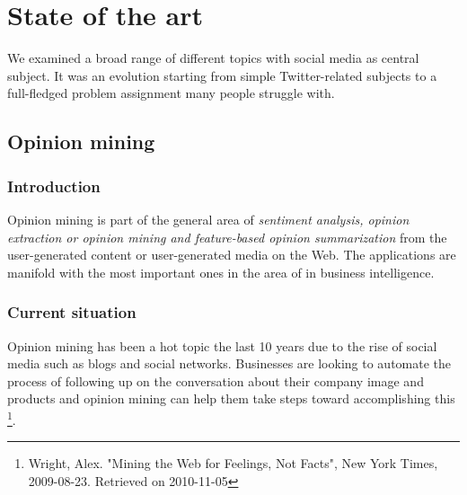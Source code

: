 \chapter{State of the art}

We examined a broad range of different topics with social media as central subject. It was an evolution starting from simple Twitter-related subjects to a full-fledged problem assignment many people struggle with. 

\section{Opinion mining}

\subsection{Introduction}
\label{general - opinion mining}
Opinion mining is part of the general area of \textit{sentiment analysis, opinion extraction or opinion mining and feature-based opinion summarization} from the user-generated content or user-generated media on the Web. The applications are manifold with the most important ones in the area of in business intelligence. 


\subsection{Current situation}


Opinion mining has been a hot topic the last 10 years due to the rise of social media such as blogs and social networks. Businesses are looking to automate the process of following up on the conversation about their company image and products and opinion mining can help them take steps toward accomplishing this \footnote{Wright, Alex. "Mining the Web for Feelings, Not Facts", New York Times, 2009-08-23. Retrieved on 2010-11-05}.

